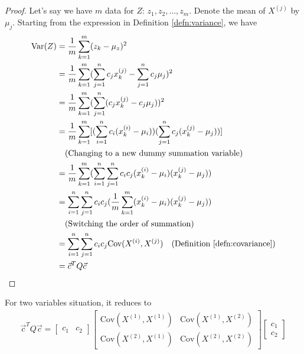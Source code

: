 \begin{proof}
Let's say we have $m$ data for $Z$: $z_1, z_2, \ldots, z_m$. Denote the mean of $X^{(j)}$ by $\mu_{j}$. Starting from the expression in Definition \ref{defn:variance}, we have
\begin{align*}
\text{Var}(Z) &= \frac{1}{m} \sum_{k=1}^m (z_k - \mu_z)^2 \\
&= \frac{1}{m} \sum_{k=1}^m (\sum_{j=1}^{n} c_jx^{(j)}_k - \sum_{j=1}^{n} c_j\mu_{j})^2  \\
&= \frac{1}{m} \sum_{k=1}^m (\sum_{j=1}^{n} (c_jx^{(j)}_k - c_j\mu_{j}))^2 \\
&= \frac{1}{m} \sum_{k=1}^m [(\sum_{i=1}^{n} c_i(x^{(i)}_k - \mu_{i}))(\sum_{j=1}^{n} c_j(x^{(j)}_k - \mu_{j}))]  \\
&\quad \text{(Changing to a new dummy summation variable)} \\
&= \frac{1}{m} \sum_{k=1}^m (\sum_{i=1}^{n}\sum_{j=1}^{n} c_ic_j (x^{(i)}_k - \mu_{i})(x^{(j)}_k - \mu_{j})) \\
&= \sum_{i=1}^{n}\sum_{j=1}^{n} c_ic_j (\frac{1}{m} \sum_{k=1}^m (x^{(i)}_k - \mu_{i})(x^{(j)}_k - \mu_{j})) \\
&\quad \text{(Switching the order of summation)} \\
&= \sum_{i=1}^{n}\sum_{j=1}^{n} c_ic_j\text{Cov}(X^{(i)}, X^{(j)}) \quad \text{(Definition \ref{defn:covariance})} \\
&= \vec{c}^T Q\vec{c}
\end{align*}
\end{proof}
For two variables situation, it reduces to
\begin{align*}
\vec{c}^TQ\vec{c} =
\begin{bmatrix}
c_1 & c_2
\end{bmatrix}
\begin{bmatrix}
\text{Cov}(X^{(1)}, X^{(1)}) & \text{Cov}(X^{(1)}, X^{(2)}) \\
\text{Cov}(X^{(2)}, X^{(1)}) & \text{Cov}(X^{(2)}, X^{(2)}) 
\end{bmatrix}
\begin{bmatrix}
c_1 \\
c_2
\end{bmatrix}
\end{align*}

